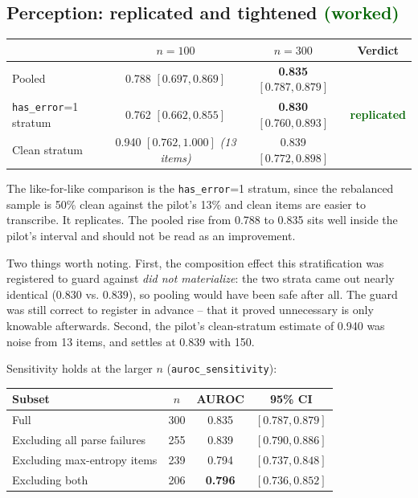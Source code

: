 \documentclass[11pt]{article}
\newcommand{\worked}[1]{\textcolor{darkgreen}{\textbf{#1}}}
\begin{document}
\subsection{Perception: replicated and tightened \worked{(worked)}}

\begin{center}
\begin{tabular}{lccc}
\toprule
 & $n=100$ & $n=300$ & Verdict \\
\midrule
Pooled & 0.788 $[0.697, 0.869]$ & \textbf{0.835} $[0.787, 0.879]$ & \\
\texttt{has\_error}=1 stratum & 0.762 $[0.662, 0.855]$ & \textbf{0.830} $[0.760, 0.893]$ & \worked{replicated} \\
Clean stratum & 0.940 $[0.762, 1.000]$ \emph{(13 items)} & 0.839 $[0.772, 0.898]$ & \\
\bottomrule
\end{tabular}
\end{center}

The like-for-like comparison is the \texttt{has\_error}=1 stratum, since the
rebalanced sample is 50\% clean against the pilot's 13\% and clean items are
easier to transcribe. It replicates. The pooled rise from 0.788 to 0.835 sits
well inside the pilot's interval and should not be read as an improvement.

Two things worth noting. First, the composition effect this stratification was
registered to guard against \emph{did not materialize}: the two strata came out
nearly identical (0.830 vs. 0.839), so pooling would have been safe after all.
The guard was still correct to register in advance -- that it proved unnecessary
is only knowable afterwards. Second, the pilot's clean-stratum estimate of 0.940
was noise from 13 items, and settles at 0.839 with 150.

Sensitivity holds at the larger $n$ (\texttt{auroc\_sensitivity}):

\begin{center}
\begin{tabular}{lccc}
\toprule
Subset & $n$ & AUROC & 95\% CI \\
\midrule
Full & 300 & 0.835 & $[0.787, 0.879]$ \\
Excluding all parse failures & 255 & 0.839 & $[0.790, 0.886]$ \\
Excluding max-entropy items & 239 & 0.794 & $[0.737, 0.848]$ \\
Excluding both & 206 & \textbf{0.796} & $[0.736, 0.852]$ \\
\bottomrule
\end{tabular}
\end{center}
\end{document}
